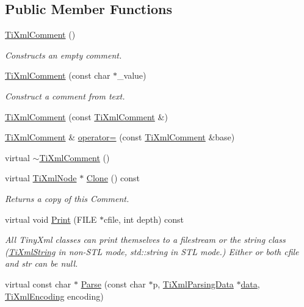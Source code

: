 \subsection*{Public Member Functions}
\begin{DoxyCompactItemize}
\item 
\hyperlink{class_ti_xml_comment_aaa3252031d3e8bd3a2bf51a1c61201b7}{TiXmlComment} ()
\begin{DoxyCompactList}\small\item\em Constructs an empty comment. \end{DoxyCompactList}\item 
\hyperlink{class_ti_xml_comment_a37e7802ef17bc03ebe5ae79bf0713d47}{TiXmlComment} (const char $\ast$\_\-value)
\begin{DoxyCompactList}\small\item\em Construct a comment from text. \end{DoxyCompactList}\item 
\hyperlink{class_ti_xml_comment_afaec41ac2760ce946ba1590eb5708e50}{TiXmlComment} (const \hyperlink{class_ti_xml_comment}{TiXmlComment} \&)
\item 
\hyperlink{class_ti_xml_comment}{TiXmlComment} \& \hyperlink{class_ti_xml_comment_aeceedc15f8b8f9ca0b6136696339b3ac}{operator=} (const \hyperlink{class_ti_xml_comment}{TiXmlComment} \&base)
\item 
virtual \hyperlink{class_ti_xml_comment_a3264ae2e9c4a127edfa03289bb2c9aa2}{$\sim$TiXmlComment} ()
\item 
virtual \hyperlink{class_ti_xml_node}{TiXmlNode} $\ast$ \hyperlink{class_ti_xml_comment_a4f6590c9c9a2b63a48972655b78eb853}{Clone} () const 
\begin{DoxyCompactList}\small\item\em Returns a copy of this Comment. \end{DoxyCompactList}\item 
virtual void \hyperlink{class_ti_xml_comment_a17398061d62c470f57801ce28fa33ad4}{Print} (FILE $\ast$cfile, int depth) const 
\begin{DoxyCompactList}\small\item\em All TinyXml classes can print themselves to a filestream or the string class (\hyperlink{class_ti_xml_string}{TiXmlString} in non-\/STL mode, std::string in STL mode.) Either or both cfile and str can be null. \end{DoxyCompactList}\item 
virtual const char $\ast$ \hyperlink{class_ti_xml_comment_a43bddc18ac057734b41d84653b71d3e0}{Parse} (const char $\ast$p, \hyperlink{class_ti_xml_parsing_data}{TiXmlParsingData} $\ast$\hyperlink{bootstrap_8cc_a923b2158227405b9f7a6eceb6c7104c8}{data}, \hyperlink{tinyxml_8h_a88d51847a13ee0f4b4d320d03d2c4d96}{TiXmlEncoding} encoding)

\end{DoxyCompactItemize}

